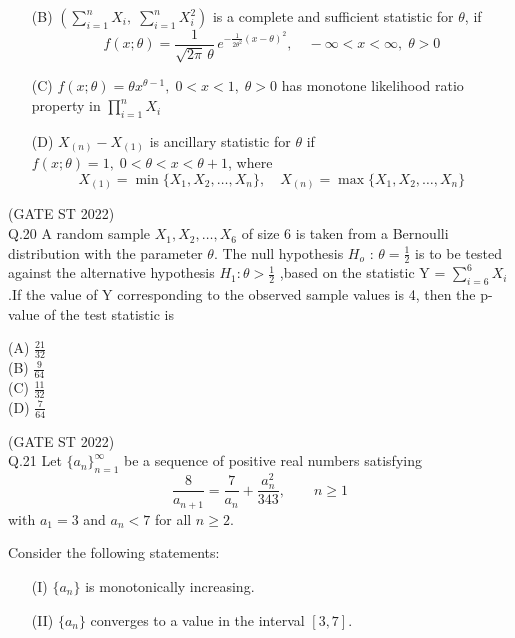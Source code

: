 \documentclass[journal,12pt,onecolumn]{IEEEtran}
\theoremstyle{remark}
\begin{document}
\begin{enumerate}
	\item[(B)] 
	$(\sum_{i=1}^n X_i,\; \sum_{i=1}^n X_i^2)$ is a complete and sufficient statistic for $\theta$, if 
	\[
	f(x; \theta) = \frac{1}{\sqrt{2 \pi}\,\theta}\,
	e^{-\frac{1}{2\theta^2}(x-\theta)^2},
	\quad -\infty < x < \infty,\; \theta > 0
	\]
	\item[(C)] 
	$f(x; \theta) = \theta x^{\theta - 1},\; 0 < x < 1,\; \theta > 0$
	has monotone likelihood ratio property in 
	$
	\prod_{i=1}^{n} X_i
	$
	\\
	\item[(D)] 
	$X_{(n)} - X_{(1)}$ is ancillary statistic for $\theta$ if 
	$f(x;\theta)=1,\; 0 < \theta < x < \theta+1$, where 
	\[
	X_{(1)} = \min\{X_1, X_2, \ldots, X_n\}, 
	\quad 
	X_{(n)} = \max\{X_1, X_2, \ldots, X_n\}
	\]
	\end{enumerate}
\hfill (GATE ST 2022)\\
Q.20 A random sample $X_1,X_2, \dots, X_6$ of size 6 is taken from a Bernoulli distribution with
the parameter $\theta$. The null hypothesis $H_o$ : $\theta = \frac{1}{2}$ is to be tested against the alternative hypothesis $H_1 : \theta > \frac{1}{2}$ ,based on the statistic Y = $\sum_{i=6}^{6}X_i$.If the value of Y
corresponding to the observed sample values is 4, then the p-value of the test
statistic is 
\\
\begin{multicols}{4}
(A) $\frac{21}{32}$\\
(B) $\frac{9}{64}$\\
(C) $\frac{11}{32}$\\
(D) $\frac{7}{64}$\\
\end{multicols}
\hfill (GATE ST 2022)\\
Q.21 Let $\{a_n\}_{n=1}^{\infty}$ be a sequence of positive real numbers satisfying 
\[
\frac{8}{a_{n+1}} = \frac{7}{a_n} + \frac{a_n^2}{343}, 
\qquad n \geq 1
\]
with $a_1 = 3$ and $a_n < 7$ for all $n \geq 2$. 

Consider the following statements:

\begin{enumerate}
	\item[(I)] $\{a_n\}$ is monotonically increasing.
	\item[(II)] $\{a_n\}$ converges to a value in the interval $[3,7]$.
\end{enumerate}
\end{document}
